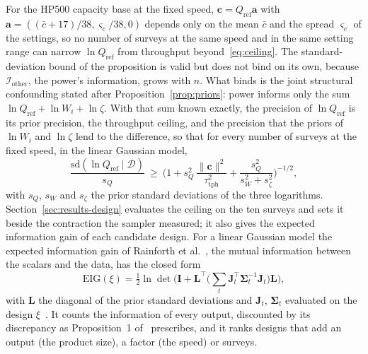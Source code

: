 For the HP500 capacity base at the fixed speed, $\mathbf c=Q_{\mathrm{ref}}\mathbf a$ with $\mathbf a=((\bar c+17)/38,\varsigma_c/38,0)$
depends only on the mean $\bar c$ and the spread $\varsigma_c$ of the settings, so no number of surveys at the same speed and
in the same setting range can narrow $\ln Q_{\mathrm{ref}}$ from throughput beyond~\eqref{eq:ceiling}. The standard-deviation
bound of the proposition is valid but does not bind on its own, because $\mathcal I_{\mathrm{other}}$, the power's information,
grows with $n$. What binds is the joint structural confounding stated after Proposition~\ref{prop:priors}: power informs only
the sum $\ln Q_{\mathrm{ref}}+\ln W_i+\ln\zeta$. With that sum known exactly, the precision of $\ln Q_{\mathrm{ref}}$ is its
prior precision, the throughput ceiling, and the precision that the priors of $\ln W_i$ and $\ln\zeta$ lend to the
difference, so that for every number of surveys at the fixed speed, in the linear Gaussian model,
\begin{equation}
\frac{\mathrm{sd}(\ln Q_{\mathrm{ref}}\mid\mathcal D)}{s_Q}\ \ge\ \Big(1+s_Q^2\,\frac{\|\mathbf c\|^2}{\tau_{\mathrm{tph}}^2}+\frac{s_Q^2}{s_{W}^2+s_{\zeta}^2}\Big)^{-1/2},
\label{eq:floor}
\end{equation}
with $s_Q$, $s_W$ and $s_\zeta$ the prior standard deviations of the three logarithms.
Section~\ref{sec:results-design} evaluates the ceiling on the ten surveys and sets it beside the contraction the sampler
measured; it also gives the expected information gain of each candidate design. For a linear Gaussian model the expected
information gain of Rainforth et al.~\cite{rainforth}, the mutual information between the scalars and the data, has the
closed form
\begin{equation}
\mathrm{EIG}(\xi)=\tfrac12\ln\det\!\Big(\mathbf I+\mathbf L^{\top}\Big(\sum_t\mathbf J_t^{\top}\boldsymbol\Sigma_t^{-1}\mathbf J_t\Big)\mathbf L\Big),
\label{eq:eig}
\end{equation}
with $\mathbf L$ the diagonal of the prior standard deviations and $\mathbf J_t$, $\boldsymbol\Sigma_t$ evaluated on the design
$\xi$~\cite{chaloner}. It counts the information of every output, discounted by its discrepancy as
Proposition~1 of~\cite{cb002} prescribes, and it ranks designs that add an output (the product size), a factor (the speed)
or surveys.
